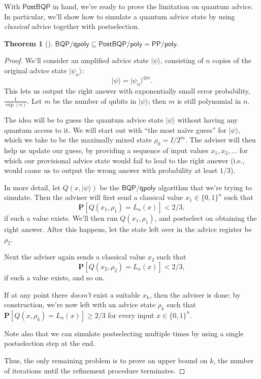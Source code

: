 \documentclass[12pt]{report}
\theoremstyle{plain}
\newtheorem{theorem}{Theorem}[section]
\theoremstyle{definition}
\renewcommand{\Pr}{\mathbf{P}}
\renewcommand{\ket}[1]{|#1\rangle}
\begin{document}
With $\mathsf{PostBQP}$ in hand, we're ready to prove the limitation on quantum advice.  In particular, we'll show how to
simulate a quantum advice state by using {\em classical} advice together with postselection.
\begin{theorem}[\cite{aar:adv}]
\label{bqpqpolyub}
   $\mathsf{BQP/qpoly} \subseteq \mathsf{PostBQP/poly} = \mathsf{PP/poly}$.
\end{theorem}
\begin{proof}
We'll consider an amplified advice state $\ket{ \psi }$, consisting of $n$ copies of the original advice state $\ket{ \psi_n }$:
$$ \ket{ \psi }  = \ket{ \psi_n }^{\otimes n}. $$
This lets us output the right answer with exponentially small error probability, $\frac{1}{\exp ( n)}$.
Let $m$ be the number of qubits in $\ket{\psi}$; then $m$ is still polynomial in $n$.

The idea will be to guess the quantum advice state $\ket{\psi}$ without having any quantum access to it.
We will start out with ``the most na\"{i}ve guess'' for $\ket{\psi}$, which we take to be the maximally mixed state $\rho_0={I}/{2^m}$.
The adviser will then help us update our guess, by providing a sequence of input values $x_1,x_2,\ldots$ for which our provisional advice state would fail to lead to the right answer (i.e., would cause us to output the wrong answer with probability at least $1/3$).

In more detail, let $Q(x,\ket{\psi})$ be the $\mathsf{BQP/qpoly}$ algorithm that we're trying to simulate.  Then the adviser will first send a classical value $x_1 \in \{ 0, 1\}^n$ such that
$$\Pr[Q(x_1, \rho_1) = L_n(x)]< 2/3,$$
if such a value exists.  We'll then run $Q(x_1,\rho_1)$, and postselect on obtaining the right answer.  After this happens, let the state left over in the advice register
be $\rho_2$.

Next the adviser again sends a classical value $x_2$ such that
$$\Pr[Q(x_2, \rho_2) = L_n(x)]< 2/3,$$
if such a value exists, and so on.

If at any point there {\em doesn't} exist a suitable $x_k$, then the adviser is done: by construction, we're now left with an advice state $\rho_k$ such that $\Pr[Q(x, \rho_k) = L_n(x)]\geq 2/3$ for every input $x\in \{0,1\}^n$.

Note also that we can simulate postselecting multiple times by using a single postselection step at the end.

Thus, the only remaining problem is to prove an upper bound on $k$, the number of iterations until the refinement procedure terminates.


\end{proof}
\end{document}
